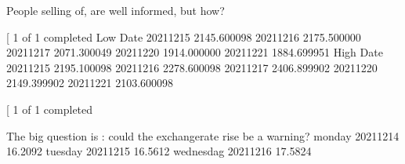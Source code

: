 \documentclass[letterpaper,10pt,english]{sphinxmanual}
\begin{document}
\sphinxAtStartPar
{} People selling of, are well
informed, but how?

\sphinxAtStartPar
{}
\begin{sphinxalltt}
{[}\sphinxstylestrong{*******************100\%*********************}{]}  1 of 1 completed
                    Low
Date
2021\sphinxhyphen{}12\sphinxhyphen{}15  2145.600098
2021\sphinxhyphen{}12\sphinxhyphen{}16  2175.500000
2021\sphinxhyphen{}12\sphinxhyphen{}17  2071.300049
2021\sphinxhyphen{}12\sphinxhyphen{}20  1914.000000
2021\sphinxhyphen{}12\sphinxhyphen{}21  1884.699951
                   High
Date
2021\sphinxhyphen{}12\sphinxhyphen{}15  2195.100098
2021\sphinxhyphen{}12\sphinxhyphen{}16  2278.600098
2021\sphinxhyphen{}12\sphinxhyphen{}17  2406.899902
2021\sphinxhyphen{}12\sphinxhyphen{}20  2149.399902
2021\sphinxhyphen{}12\sphinxhyphen{}21  2103.600098
\end{sphinxalltt}

\begin{sphinxVerbatim}[commandchars=\\\{\}]
\end{sphinxVerbatim}

\noindent{}
\begin{sphinxalltt}
{[}\sphinxstylestrong{*******************100\%*********************}{]}  1 of 1 completed
\end{sphinxalltt}

\begin{sphinxVerbatim}[commandchars=\\\{\}]
\end{sphinxVerbatim}

\noindent{}

\begin{sphinxVerbatim}[commandchars=\\\{\}]
        
\end{sphinxVerbatim}

\sphinxAtStartPar
The big question is : could the exchange\sphinxhyphen{}rate rise be a warning? monday
2021\sphinxhyphen{}12\sphinxhyphen{}14 16.2092 tuesday 2021\sphinxhyphen{}12\sphinxhyphen{}15 16.5612 wednesdag 2021\sphinxhyphen{}12\sphinxhyphen{}16
17.5824
\end{document}
